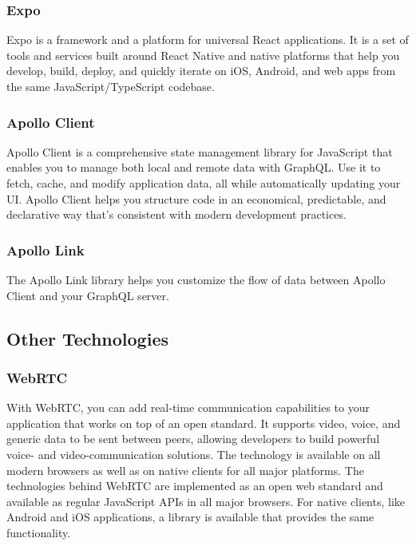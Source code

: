     \subsubsection{Expo}
    Expo is a framework and a platform for universal React applications. 
    It is a set of tools and services built around React Native and native platforms that help you develop, build, 
    deploy, and quickly iterate on iOS, Android, and web apps from the same JavaScript/TypeScript codebase.

    \subsubsection{Apollo Client}
    Apollo Client is a comprehensive state management library for JavaScript that enables you to manage both local and remote data with GraphQL.
    Use it to fetch, cache, and modify application data, all while automatically updating your UI.
    Apollo Client helps you structure code in an economical, predictable, and declarative way that's consistent with modern development practices. 

    \subsubsection{Apollo Link}
    The Apollo Link library helps you customize the flow of data between Apollo Client and your GraphQL server.

\subsection{Other Technologies}

    \subsubsection{WebRTC}
    With WebRTC, you can add real-time communication capabilities to your application that works on top of an open standard. 
    It supports video, voice, and generic data to be sent between peers, allowing developers to build powerful 
    voice- and video-communication solutions. The technology is available on all modern browsers as well as on native clients 
    for all major platforms. The technologies behind WebRTC are implemented as an open web standard and available as regular JavaScript APIs 
    in all major browsers. For native clients, like Android and iOS applications, a library is available that provides the same functionality.

